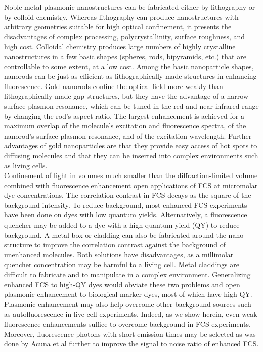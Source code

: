 \documentclass[journal=jacsat,manuscript=article]{achemso}
\begin{document}
Noble-metal plasmonic nanostructures can be fabricated either by lithography or by colloid chemistry.\cite{zijlstra2011single} Whereas lithography can produce nanostructures with arbitrary geometries suitable for high optical confinement, it presents the disadvantages of complex processing, polycrystallinity, surface roughness, and high cost. Colloidal chemistry produces large numbers of highly crystalline nanostructures in a few basic shapes (spheres, rods, bipyramids, etc.) that are controllable to some extent, at a low cost. Among the basic nanoparticle shapes, nanorods\cite{yuan2013thousandfold} can be just as efficient as lithographically-made structures\cite{punj2013a,kinkhabwala2009large} in enhancing fluorescence. Gold nanorods confine the optical field more weakly than lithographically made gap structures, but they have the advantage of a narrow surface plasmon resonance, which can be tuned in the red and near infrared range by changing the rod’s aspect ratio.\cite{khatua2014resonant} The largest enhancement is achieved for a maximum overlap of the molecule’s excitation and fluorescence spectra, of the nanorod’s surface plasmon resonance, and of the excitation wavelength. Further advantages of gold nanoparticles are that they provide easy access of hot spots to diffusing molecules and that they can be inserted into complex environments such as living cells.\\

Confinement of light in volumes much smaller than the diffraction-limited volume combined with fluorescence enhancement open applications of FCS at micromolar dye concentrations. The correlation contrast in FCS decays as the square of the background intensity. To reduce background, most enhanced FCS experiments have been done on dyes with low quantum yields.\cite{kinkhabwala2012fluorescence,estrada200810000} Alternatively, a fluorescence quencher may be added to a dye with a high quantum yield (QY) to reduce background.\cite{punj2013a,punj2013gold} A metal box or cladding\cite{ghenuche2015matching} can also be fabricated around the nano structure to improve the correlation contrast against the background of unenhanced molecules. Both solutions have disadvantages, as a millimolar quencher concentration may be harmful to a living cell. Metal claddings are difficult to fabricate and to manipulate in a complex environment. Generalizing enhanced FCS to high-QY dyes would obviate these two problems and open plasmonic enhancement to biological marker dyes, most of which have high QY. Plasmonic enhancement may also help overcome other background sources such as autofluorescence in live-cell experiments. Indeed, as we show herein, even weak fluorescence enhancements suffice to overcome background in FCS experiments. Moreover, fluorescence photons with short emission times may be selected as was done by Acuna et al\cite{acuna2012fluorescence} further to improve the signal to noise ratio of enhanced FCS.\\
\end{document}
